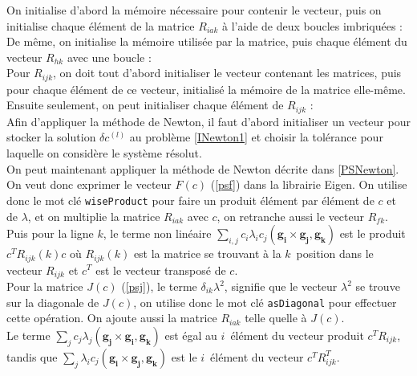 On initialise d'abord la mémoire nécessaire pour contenir le vecteur, puis on initialise chaque élément de la matrice $R_{iak}$ à l'aide de deux boucles imbriquées :\\


De même, on initialise la mémoire utilisée par la matrice, puis chaque élément du vecteur $R_{hk}$ avec une boucle :\\


Pour $R_{ijk}$, on doit tout d'abord initialiser le vecteur contenant les matrices, puis pour chaque élément de ce vecteur, initialisé la mémoire de la matrice elle-même. Ensuite seulement, on peut initialiser chaque élément de $R_{ijk}$ :\\


Afin d'appliquer la méthode de Newton, il faut d'abord initialiser un vecteur pour stocker la solution $\delta c^{(l)}$ au problème \ref{INewton1} et choisir la tolérance pour laquelle on considère le système résolut.\\


On peut maintenant appliquer la méthode de Newton décrite dans \ref{PSNewton}. On veut donc exprimer le vecteur $F(c)$ (\ref{psf}) dans la librairie Eigen. On utilise donc le mot clé \texttt{wiseProduct} pour faire un produit élément par élément de $c$ et de $\lambda$, et on multiplie la matrice $R_{iak}$ avec $c$, on retranche aussi le vecteur $R_{fk}$.\\
Puis pour la ligne $k$, le terme non linéaire $\sum_{i,j} c_i\lambda_i c_j (\mathbf{g_i}\times \mathbf{g_j}, \mathbf{g_k})$ est le produit $c^TR_{ijk}(k)c$ où $R_{ijk}(k)$ est la matrice se trouvant à la $k$\ieme\ position dans le vecteur $R_{ijk}$ et $c^T$ est le vecteur transposé de $c$.\\


Pour la matrice $J(c)$ (\ref{psj}), le terme $\delta_{ik}\lambda^2$, signifie que le vecteur $\lambda^2$ se trouve sur la diagonale de $J(c)$, on utilise donc le mot clé \texttt{asDiagonal} pour effectuer cette opération. On ajoute aussi la matrice $R_{iak}$ telle quelle à $J(c)$.\\
Le terme $\sum_j c_j\lambda_j (\mathbf{g_j}\times\mathbf{g_i},\mathbf{g_k})$ est égal au $i$\ieme\ élément du vecteur produit $c^TR_{ijk}$, tandis que $\sum_j\lambda_i c_j (\mathbf{g_i}\times\mathbf{g_j},\mathbf{g_k})$ est le $i$\ieme\ élément du vecteur $c^TR_{ijk}^T$.\\


